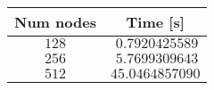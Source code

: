 \begin{center}
\begin{tabular}{cc}
\toprule
\multicolumn{1}{c}{Num nodes}&\multicolumn{1}{c}{Time [s]}\tabularnewline
\midrule
$128$&$~0.7920425589$\tabularnewline
$256$&$~5.7699309643$\tabularnewline
$512$&$45.0464857090$\tabularnewline
\bottomrule
\end{tabular}\end{center}
